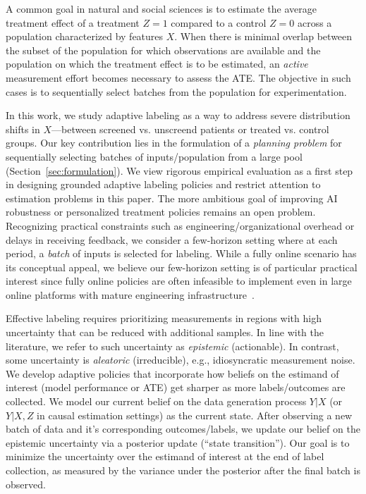 \begin{example}
A common goal in natural and social sciences is to estimate the average treatment effect of a treatment $Z=1$ 
compared to a control $Z=0$ across a population characterized by features $X$. When there is minimal overlap between the subset of the population for which observations are available and the population on which the treatment effect is to be estimated, an \emph{active} measurement effort becomes necessary to assess the ATE. The objective in such cases is to sequentially select batches from the population for experimentation.
\end{example}


In this work, we study adaptive labeling as a way to address severe distribution shifts in $X$---between screened vs. unscreend patients or treated vs. control groups. 
Our key contribution lies in the  formulation of a \emph{planning problem} 
for sequentially selecting batches of inputs/population from a large pool
(Section~\ref{sec:formulation}). 
We view rigorous empirical evaluation 
as a first step in 
designing grounded adaptive labeling policies and restrict attention to estimation problems in this paper.  The more ambitious goal of improving AI robustness or personalized treatment policies remains an open problem. 
Recognizing practical constraints such as engineering/organizational overhead or delays in receiving feedback, we consider a few-horizon setting where at
each period, a \emph{batch} of inputs is selected for labeling. 
While a fully online scenario has its conceptual appeal, we believe our few-horizon setting is of particular practical interest since fully online policies are often infeasible to implement even in large online platforms with mature engineering infrastructure~\citep{WuEtAl19, NamkoongDaBa20, AvadhanulaEtAl22}.

Effective labeling requires prioritizing measurements in regions with high
uncertainty that can be reduced with additional samples. In line with the literature, we refer to such uncertainty as  \emph{epistemic} (actionable). In contrast, some uncertainty is \emph{aleatoric} (irreducible), e.g., idiosyncratic measurement noise. 
We develop adaptive policies that
incorporate how beliefs on the estimand of interest (model performance or ATE) get sharper as more labels/outcomes are collected.   We model our current belief on the data generation process $Y|X$ (or $Y|X,Z$ in causal estimation settings) as the current state. After observing a new batch of data and it's corresponding outcomes/labels, we update
our belief on the epistemic uncertainty via a posterior update (``state
transition''). 
Our goal is to minimize the uncertainty over 
the estimand of interest
at the end of label collection, 
as measured by the variance under the
posterior after the final batch is observed. 

